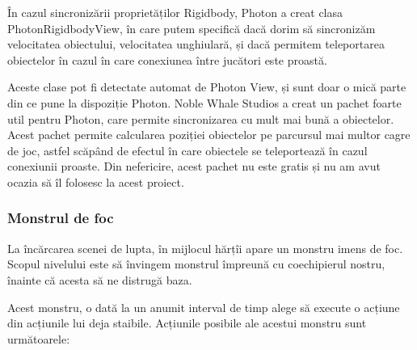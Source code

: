 \documentclass[12pt, a4paper]{article}
\begin{document}
	În cazul sincronizării proprietăților Rigidbody, Photon a creat clasa PhotonRigidbodyView, în care putem specifică dacă dorim să sincronizăm velocitatea obiectului, velocitatea unghiulară, și dacă permitem teleportarea obiectelor în cazul în care conexiunea între jucători este proastă.
	\newline
	
	Aceste clase pot fi detectate automat de Photon View, și sunt doar o mică parte din ce pune la dispoziție Photon. Noble Whale Studios a creat un pachet foarte util pentru Photon, care permite sincronizarea cu mult mai bună a obiectelor. Acest pachet permite calcularea poziției obiectelor pe parcursul mai multor cagre de joc, astfel scăpând de efectul în care obiectele se teleportează în cazul conexiunii proaste. Din nefericire, acest pachet nu este gratis și nu am avut ocazia să îl folosesc la acest proiect.
	
	
	
	
	
	\subsubsection{Monstrul de foc}
	\label{section: boss}
	
	La încărcarea scenei de lupta, în mijlocul hărțîi apare un monstru imens de foc. Scopul nivelului este să învingem monstrul împreună cu coechipierul nostru, înainte că acesta să ne distrugă baza.
	
	Acest monstru, o dată la un anumit interval de timp alege să execute o acțiune din acțiunile lui deja staibile. Acțiunile posibile ale acestui monstru sunt următoarele:
	
\end{document}
